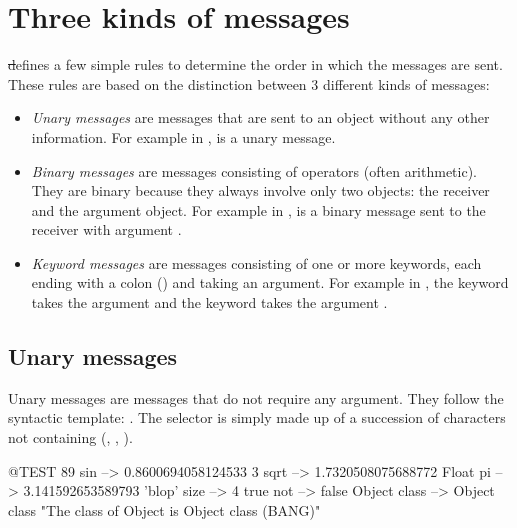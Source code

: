 \documentclass[a4paper,10pt,twoside]{book}
\begin{document}
\section{Three kinds of messages}

\st defines a few simple rules to determine the order in which the messages are sent. These rules are based on the distinction between 3 different kinds of messages: 
\begin{itemize}
\item \emph{Unary messages} are messages that are sent to an object without any other information. For example in ,  is a unary message. 
\item  \emph{Binary messages} are messages consisting of operators (often arithmetic). They are binary because they always involve only two objects: the receiver and the argument object. For example in , \ct{+} is a binary message sent to the receiver  with argument . 
\item  \emph{Keyword messages} are messages consisting of one or more keywords, each ending with a colon (\ct{:}) and taking an argument.
For example in , the keyword  takes the argument  and the keyword  takes the argument .
\end{itemize}

\subsection{Unary messages}
Unary messages are messages that do not require any argument. They follow the syntactic template: . The selector is simply made up of a succession of characters not containing \ct{:} (\eg {}, , ).
\begin{code}{@TEST}
89 sin           --> 0.8600694058124533
3 sqrt           --> 1.7320508075688772
Float pi         --> 3.141592653589793
'blop' size     --> 4
true not        --> false
Object class --> Object class  "The class of Object is Object class (BANG)"
\end{code}

\end{document}
